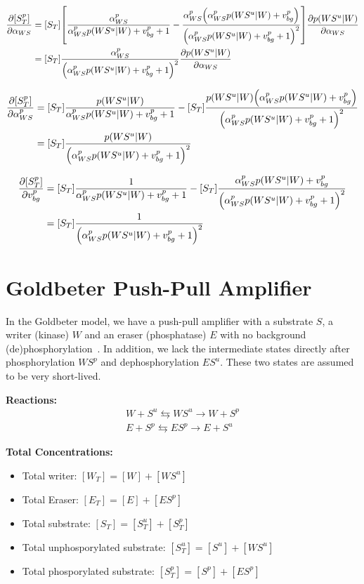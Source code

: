 \documentclass[aps,onecolumn,superscriptaddress,notitlepage]{revtex4-1}
\begin{document}
\begin{align}
\pdv{[S^p_T]}{\alpha_{WS}} &=  [S_T]\qty[\frac{\alpha_{WS}^p}{\alpha_{WS}^p p(WS^u|W) + v_{bg}^p+1} -  \frac{\alpha_{WS}^p\qty(\alpha_{WS}^p p(WS^u|W) + v_{bg}^p)}{\qty(\alpha_{WS}^p p(WS^u|W) + v_{bg}^p+1)^2}]\pdv{p(WS^u|W)}{\alpha_{WS}}\\
&= [S_T] \frac{\alpha_{WS}^p}{\qty(\alpha_{WS}^p p(WS^u|W) + v_{bg}^p+1)^2}\pdv{p(WS^u|W)}{\alpha_{WS}}
\end{align}

\begin{align}
\pdv{[S^p_T]}{\alpha_{WS}^p} &=  [S_T]\frac{ p(WS^u|W)}{\alpha_{WS}^p p(WS^u|W) + v_{bg}^p+1} -  [S_T]\frac{p(WS^u|W)\qty(\alpha_{WS}^p p(WS^u|W) + v_{bg}^p)}{\qty(\alpha_{WS}^p p(WS^u|W) + v_{bg}^p+1)^2}\\
&= [S_T]\frac{p(WS^u|W)}{\qty(\alpha_{WS}^p p(WS^u|W) + v_{bg}^p+1)^2}
\end{align}


\begin{align}
\pdv{[S^p_T]}{v_{bg}^p} &=  [S_T]\frac{ 1}{\alpha_{WS}^p p(WS^u|W) + v_{bg}^p+1} - [S_T] \frac{\alpha_{WS}^p p(WS^u|W) + v_{bg}^p}{\qty(\alpha_{WS}^p p(WS^u|W) + v_{bg}^p+1)^2}\\
&= [S_T]\frac{1}{\qty(\alpha_{WS}^p p(WS^u|W) + v_{bg}^p+1)^2}
\end{align}

\section{Goldbeter Push-Pull Amplifier}

In the Goldbeter model, we have a push-pull amplifier with a substrate $S$, a writer (kinase) $W$ and an eraser (phosphatase) $E$ with no background (de)phosphorylation~\cite{Goldbeter1981}. In addition, we lack the intermediate states directly after phosphorylation $WS^p$ and dephosphorylation $ES^u$. These two states are assumed to be very short-lived.

\textbf{Reactions:}
\begin{gather}
W + S^u \leftrightarrows WS^u  \rightarrow W + S^p\\
E + S^p \leftrightarrows ES^p  \rightarrow E + S^u
\end{gather}

\textbf{Total Concentrations:}
\begin{itemize}
\item Total writer: $[W_T] = [W] + [WS^u]$
\item Total Eraser: $[E_T] = [E] + [ES^p]$
\item Total substrate: $[S_T] = [S^u_T] + [S^p_T]$
\item Total unphosporylated substrate: $[S^u_T] = [S^u] + [WS^u]$
\item Total phosporylated substrate: $[S^p_T] = [S^p] + [ES^p]$
\end{itemize}
\end{document}
